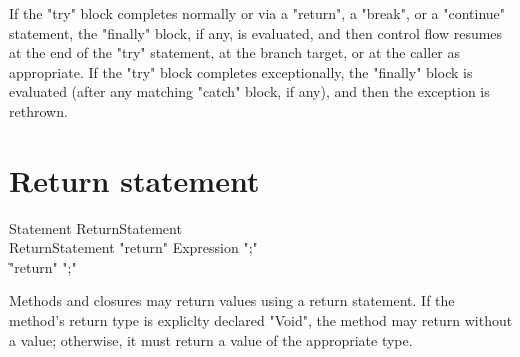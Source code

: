 If the \xcd"try" block completes normally
or via a \xcd"return", a \xcd"break", or a
\xcd"continue" statement, 
the \xcd"finally"
block, if any, is evaluated, and then control flow resumes at
the end of the \xcd"try" statement, at the branch target, or at
the caller as appropriate.
If the \xcd"try" block completes
exceptionally, the \xcd"finally" block is evaluated (after any
matching \xcd"catch" block, if any), and then the
exception is rethrown.

\section{Return statement}

\begin{grammar}
Statement \: ReturnStatement \\
ReturnStatement \: \xcd"return" Expression \xcd";" \\
             \| \xcd"return" \xcd";" \\
\end{grammar}

Methods and closures may return values using a return statement.
If the method's return type is expliclty declared \xcd"Void",
the method may return without a value; otherwise, it must return
a value of the appropriate type.
